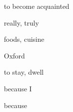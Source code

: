 \documentclass[avery5371,grid,frame]{flashcards}
\begin{document}
\begin{flashcard}{\LARGE to become acquainted}
\LARGE {}
\end{flashcard}
\begin{flashcard}{\LARGE really, truly}
\LARGE {}
\end{flashcard}
\begin{flashcard}{\LARGE foods, cuisine}
\LARGE {}
\end{flashcard}
\begin{flashcard}{\LARGE Oxford}
\LARGE {}
\end{flashcard}
\begin{flashcard}{\LARGE to stay, dwell}
\LARGE {}
\end{flashcard}
\begin{flashcard}{\LARGE because I}
\LARGE {}
\end{flashcard}
\begin{flashcard}{\LARGE because}
\LARGE {}
\end{flashcard}
\end{document}

